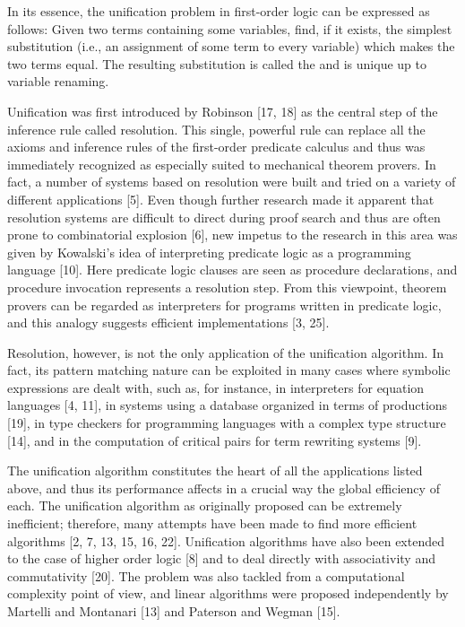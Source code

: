 \label{mmalg1}

In its essence, the unification problem in first-order logic can be expressed as
follows: Given two terms containing some variables, find, if it exists, the
simplest substitution (i.e., an assignment of some term to every variable) which
makes the two terms equal. The resulting substitution is called the  and is unique up to variable renaming.

Unification was first introduced by Robinson [17, 18] as the central step of the
inference rule called resolution. This single, powerful rule can replace all the
axioms and inference rules of the first-order predicate calculus and thus was
immediately recognized as especially suited to mechanical theorem provers. In
fact, a number of systems based on resolution were built and tried on a variety
of different applications [5]. Even though further research made it apparent
that resolution systems are difficult to direct during proof search and thus are
often prone to combinatorial explosion [6], new impetus to the research in this
area was given by Kowalski's idea of interpreting predicate logic as a
programming language [10]. Here predicate logic clauses are seen as procedure
declarations, and procedure invocation represents a resolution step. From this
viewpoint, theorem provers can be regarded as interpreters for programs written
in predicate logic, and this analogy suggests efficient implementations [3, 25].

Resolution, however, is not the only application of the unification algorithm.
In fact, its pattern matching nature can be exploited in many cases where
symbolic expressions are dealt with, such as, for instance, in interpreters for
equation languages [4, 11], in systems using a database organized in terms of
productions [19], in type checkers for programming languages with a complex type
structure [14], and in the computation of critical pairs for term rewriting
systems [9].

The unification algorithm constitutes the heart of all the applications listed
above, and thus its performance affects in a crucial way the global efficiency
of each. The unification algorithm as originally proposed can be extremely
inefficient; therefore, many attempts have been made to find more efficient
algorithms [2, 7, 13, 15, 16, 22]. Unification algorithms have also been
extended to the case of higher order logic [8] and to deal directly with
associativity and commutativity [20]. The problem was also tackled from a
computational complexity point of view, and linear algorithms were proposed
independently by Martelli and Montanari [13] and Paterson and Wegman [15].

